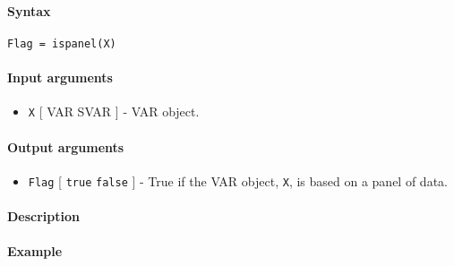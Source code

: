 


	\paragraph{Syntax}\label{syntax}

\begin{verbatim}
Flag = ispanel(X)
\end{verbatim}

\paragraph{Input arguments}\label{input-arguments}

\begin{itemize}
\itemsep1pt\parskip0pt
\item
  \texttt{X} {[} VAR \textbar{} SVAR {]} - VAR object.
\end{itemize}

\paragraph{Output arguments}\label{output-arguments}

\begin{itemize}
\itemsep1pt\parskip0pt
\item
  \texttt{Flag} {[} \texttt{true} \textbar{} \texttt{false} {]} - True
  if the VAR object, \texttt{X}, is based on a panel of data.
\end{itemize}

\paragraph{Description}\label{description}

\paragraph{Example}\label{example}


